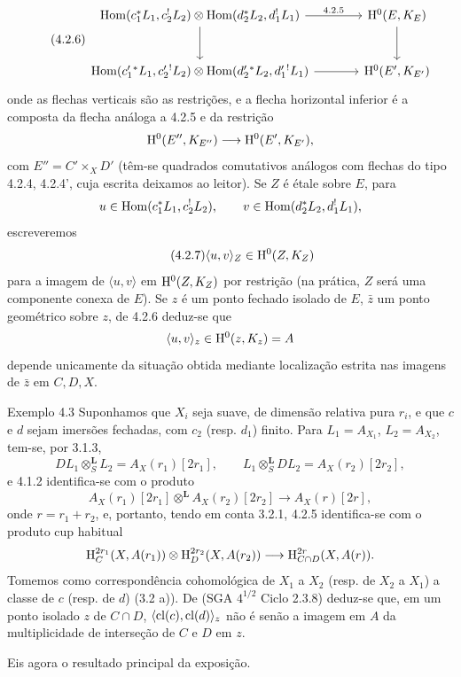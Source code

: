 \begin{equation}
\tag{4.2.6}
\begin{tikzcd}[column sep=large,row sep=large]
\Hom(c_1^*L_1,c_2^!L_2)\otimes\Hom(d_2^*L_2,d_1^!L_1)
  \arrow[r,"4.2.5"] \arrow[d] &
\H^0(E,K_E)\arrow[d] \\
\Hom(c_1'{}^*L_1,c_2'{}^!L_2)\otimes\Hom(d_2'{}^*L_2,d_1'{}^!L_1)
  \arrow[r] &
\H^0(E',K_{E'})
\end{tikzcd}
\end{equation}
onde as flechas verticais são as restrições, e a flecha horizontal inferior é a composta da flecha análoga a 4.2.5 e da restrição
\[
\mathrm{H}^0(E'',K_{E''})\longrightarrow \mathrm{H}^0(E',K_{E'}),
\]
com $E''=C'\times_{X}D'$ (têm-se quadrados comutativos análogos com flechas do tipo 4.2.4, 4.2.4', cuja escrita deixamos ao leitor). Se $Z$ é étale sobre $E$, para
\[
u\in\operatorname{Hom}(c_1^*L_1,c_2^!L_2),\qquad
v\in\operatorname{Hom}(d_2^*L_2,d_1^!L_1),
\]
escreveremos
\begin{equation}
\tag{4.2.7}
\langle u,v\rangle_Z\in \mathrm{H}^0(Z,K_Z)
\end{equation}
para a imagem de $\langle u,v\rangle$ em $\mathrm{H}^0(Z,K_Z)$ por restrição (na prática, $Z$ será uma componente conexa de $E$). Se $z$ é um ponto fechado isolado de $E$, $\bar z$ um ponto geométrico sobre $z$, de 4.2.6 deduz-se que
\[
\langle u,v\rangle_z\in \mathrm{H}^0(z,K_z)=A
\]
depende unicamente da situação obtida mediante localização estrita nas imagens de $\bar z$ em $C,D,X$.

\begin{statement}{Exemplo 4.3}
Suponhamos que $X_i$ seja suave, de dimensão relativa pura $r_i$, e que $c$ e $d$ sejam imersões fechadas, com $c_2$ (resp. $d_1$) finito. Para $L_1=A_{X_1}$, $L_2=A_{X_2}$, tem-se, por 3.1.3,
\[
DL_1\otimes_S^{\mathbf L}L_2=A_X(r_1)[2r_1],\qquad
L_1\otimes_S^{\mathbf L}DL_2=A_X(r_2)[2r_2],
\]
e 4.1.2 identifica-se com o produto
\[
A_X(r_1)[2r_1]\otimes^{\mathbf L}A_X(r_2)[2r_2]\longrightarrow A_X(r)[2r],
\]
onde $r=r_1+r_2$, e, portanto, tendo em conta 3.2.1, 4.2.5 identifica-se com o produto cup habitual
\[
\mathrm{H}_C^{2r_1}(X,A(r_1))\otimes \mathrm{H}_D^{2r_2}(X,A(r_2))
\longrightarrow
\mathrm{H}_{C\cap D}^{2r}(X,A(r)).
\]
Tomemos como correspondência cohomológica de $X_1$ a $X_2$ (resp. de $X_2$ a $X_1$) a classe de $c$ (resp. de $d$) (3.2 a)). De (SGA $4^{1/2}$ Ciclo 2.3.8) deduz-se que, em um ponto isolado $z$ de $C\cap D$, $\langle \operatorname{cl}(c),\operatorname{cl}(d)\rangle_z$ não é senão a imagem em $A$ da multiplicidade de interseção de $C$ e $D$ em $z$.
\end{statement}

Eis agora o resultado principal da exposição.
